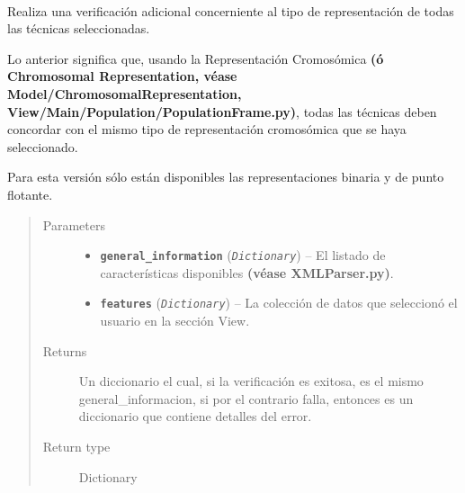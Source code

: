 \documentclass[letterpaper,10pt,english]{sphinxmanual}
\begin{document}
\begin{fulllineitems}
\begin{fulllineitems}
\label{Controller/Verifier:Controller.Verifier.Verifier.sanitize_techniques}~
\begin{DUlineblock}{0em}
\item[] Realiza una verificación adicional concerniente al tipo de representación de todas las técnicas seleccionadas.
\item[] Lo anterior significa que, usando la Representación Cromosómica \textbf{(ó Chromosomal Representation,
véase Model/ChromosomalRepresentation, View/Main/Population/PopulationFrame.py)}, todas las técnicas
deben concordar con el mismo tipo de representación cromosómica que se haya seleccionado.
\item[] Para esta versión sólo están disponibles las representaciones binaria y de punto flotante.
\end{DUlineblock}
\begin{quote}\begin{description}
\item[{Parameters}] \leavevmode\begin{itemize}
\item {} 
\textbf{\texttt{general\_information}} (\emph{\texttt{Dictionary}}) -- El listado de características disponibles \textbf{(véase XMLParser.py)}.

\item {} 
\textbf{\texttt{features}} (\emph{\texttt{Dictionary}}) -- La colección de datos que seleccionó el usuario en la sección View.

\end{itemize}

\item[{Returns}] \leavevmode
Un diccionario el cual, si la verificación es exitosa, es el mismo general\_informacion,
si por el contrario falla, entonces es un diccionario que contiene detalles del error.

\item[{Return type}] \leavevmode
Dictionary

\end{description}\end{quote}

\end{fulllineitems}



\end{fulllineitems}
\end{document}
